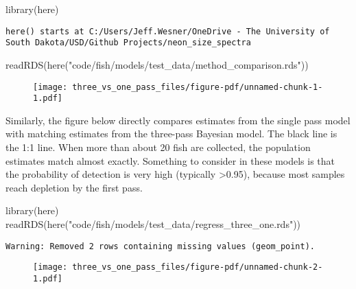\documentclass[
  letterpaper,
  DIV=11,
  numbers=noendperiod]{scrartcl}
\newenvironment{Shaded}{\begin{snugshade}}{\end{snugshade}}
\newcommand{\FunctionTok}[1]{\textcolor[rgb]{0.28,0.35,0.67}{#1}}
\newcommand{\NormalTok}[1]{\textcolor[rgb]{0.00,0.23,0.31}{#1}}
\newcommand{\StringTok}[1]{\textcolor[rgb]{0.13,0.47,0.30}{#1}}
\begin{document}
\begin{Shaded}
\begin{Highlighting}[]
\FunctionTok{library}\NormalTok{(here)}
\end{Highlighting}
\end{Shaded}

\begin{verbatim}
here() starts at C:/Users/Jeff.Wesner/OneDrive - The University of South Dakota/USD/Github Projects/neon_size_spectra
\end{verbatim}

\begin{Shaded}
\begin{Highlighting}[]
\FunctionTok{readRDS}\NormalTok{(}\FunctionTok{here}\NormalTok{(}\StringTok{"code/fish/models/test\_data/method\_comparison.rds"}\NormalTok{))}
\end{Highlighting}
\end{Shaded}

\begin{figure}[H]

{\centering \texttt{[image: three\_vs\_one\_pass\_files/figure-pdf/unnamed-chunk-1-1.pdf]}

}

\end{figure}

Similarly, the figure below directly compares estimates from the single
pass model with matching estimates from the three-pass Bayesian model.
The black line is the 1:1 line. When more than about 20 fish are
collected, the population estimates match almost exactly. Something to
consider in these models is that the probability of detection is very
high (typically \textgreater0.95), because most samples reach depletion
by the first pass.

\begin{Shaded}
\begin{Highlighting}[]
\FunctionTok{library}\NormalTok{(here)}
\FunctionTok{readRDS}\NormalTok{(}\FunctionTok{here}\NormalTok{(}\StringTok{"code/fish/models/test\_data/regress\_three\_one.rds"}\NormalTok{))}
\end{Highlighting}
\end{Shaded}

\begin{verbatim}
Warning: Removed 2 rows containing missing values (geom_point).
\end{verbatim}

\begin{figure}[H]

{\centering \texttt{[image: three\_vs\_one\_pass\_files/figure-pdf/unnamed-chunk-2-1.pdf]}

}

\end{figure}
\end{document}
